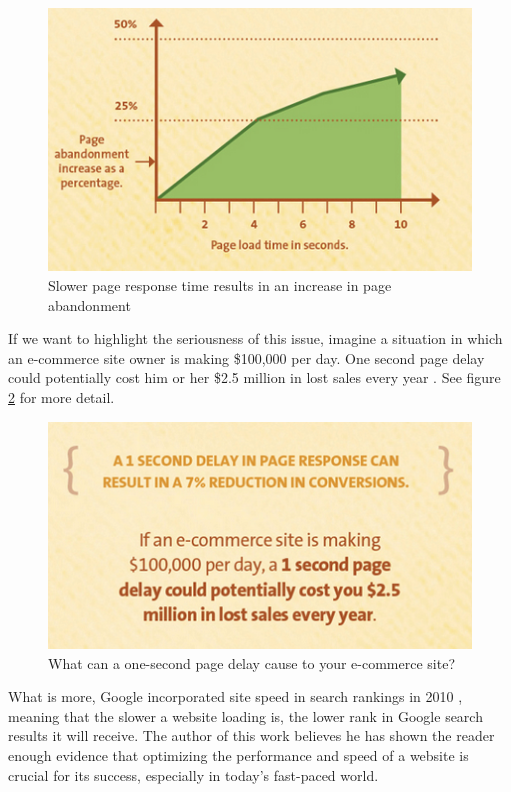 \begin{figure}[H]
\begin{center}
\includegraphics[scale=0.5]{figures/page-abandonment-chart.png}
\caption{Slower page response time results in an increase in page abandonment}
\label{fig:kissmetrics-page-abandonment}
\end{center}
\end{figure}

If we want to highlight the seriousness of this issue, imagine a situation in which an e-commerce site owner is making \$100,000 per day. One second page delay could potentially cost him or her \$2.5 million in lost sales every year \cite{Fig:Kissmetrics-page-abandonment}. See figure \ref{fig:kissmetrics-eshop-delay} for more detail.

\begin{figure}[H]
\begin{center}
\includegraphics[scale=0.5]{figures/kissmetrics-eshop-delay.png}
\caption{What can a one-second page delay cause to your e-commerce site?}
\label{fig:kissmetrics-eshop-delay}
\end{center}
\end{figure}

What is more, Google incorporated site speed in search rankings in 2010 \cite{MattCutts:Google-site-speed-seo}, meaning that the slower a website loading is, the lower rank in Google search results it will receive. The author of this work believes he has shown the reader enough evidence that optimizing the performance and speed of a website is crucial for its success, especially in today's fast-paced world.

